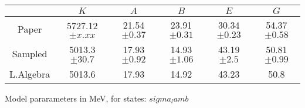 \begin{tabular}{c | c  c  c  c  c }\hline \hline
          & $K$        & $A$             & $B$     & $E$        & $G$            \\ \hline
Paper     & 5727.12$\pm x.xx$ & 21.54$\pm 0.37$ & 23.91$\pm 0.31$ & 30.34 $\pm 0.23$ & 54.37$\pm 0.58$ \\ 
Sampled   & 5013.3  $\pm 30.7 $ & 17.93  $\pm 0.92 $ & 14.93  $\pm 1.06 $ & 43.19  $\pm 2.5 $ & 50.81  $\pm 0.99 $ \\ 
L.Algebra & 5013.6  & 17.93  & 14.92  & 43.23 & 50.8  \\ 
\hline\hline
\end{tabular}
\caption{Model pararameters in MeV, for states: $ sigma_lamb $}
